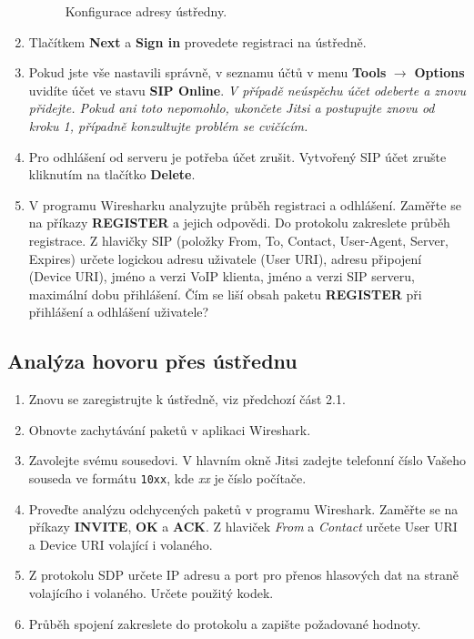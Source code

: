 \begin{enumerate}
\begin{figure}[h!]
        \caption{Konfigurace adresy ústředny.}
        \label{fig:registration2}
      \end{figure}
    \item Tlačítkem {\bf Next} a {\bf Sign in} provedete registraci na ústředně.
    \item  Pokud jste vše nastavili správně, v seznamu účtů v menu {\bf Tools} $\rightarrow$ {\bf Options} uvidíte účet ve stavu {\bf SIP Online}. {\it V případě neúspěchu účet odeberte a znovu přidejte. Pokud ani toto nepomohlo, ukončete Jitsi a postupujte znovu od kroku 1, případně konzultujte problém se cvičícím.}
    \item Pro odhlášení od serveru je potřeba účet zrušit. Vytvořený SIP účet zrušte kliknutím na tlačítko {\bf Delete}.
    \item V programu Wiresharku analyzujte průběh registraci a odhlášení. Zaměřte se na příkazy {\bf REGISTER} a jejich odpovědi. Do protokolu zakreslete průběh registrace. Z hlavičky SIP (položky From, To, Contact, User-Agent, Server, Expires) určete logickou adresu uživatele (User URI), adresu připojení (Device URI), jméno a verzi VoIP klienta, jméno a verzi SIP serveru, maximální dobu přihlášení. Čím se liší obsah paketu {\bf REGISTER} při přihlášení a odhlášení uživatele?
\end{enumerate}

\subsection{Analýza hovoru přes ústřednu}
\begin{enumerate}
    \item Znovu se zaregistrujte k ústředně, viz předchozí část 2.1.
    \item Obnovte zachytávání paketů v aplikaci Wireshark.
    \item Zavolejte svému sousedovi. V hlavním okně Jitsi zadejte telefonní číslo Vašeho souseda ve formátu {\tt 10xx}, kde {\it xx} je číslo počítače.
    \item Proveďte analýzu odchycených paketů v programu Wireshark. Zaměřte se na příkazy {\bf INVITE}, {\bf OK} a {\bf ACK}. Z hlaviček {\it From} a {\it Contact} určete User URI a Device URI volající i volaného.
    \item Z protokolu SDP určete IP adresu a port pro přenos hlasových dat na straně volajícího i volaného. Určete použitý kodek. 
    \item Průběh spojení zakreslete do protokolu a zapište požadované hodnoty. 
\end{enumerate}

